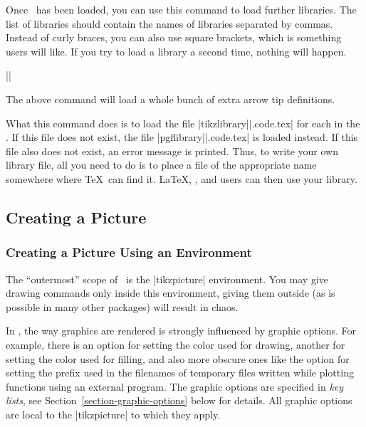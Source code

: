 \begin{command}{\usetikzlibrary{}}
    Once \tikzname\ has been loaded, you can use this command to load further
    libraries. The list of libraries should contain the names of libraries
    separated by commas. Instead of curly braces, you can also use square
    brackets, which is something  users will like. If you try to load
    a library a second time, nothing will happen.

    \example |\usetikzlibrary{arrows.meta}|

    The above command will load a whole bunch of extra arrow tip definitions.

    What this command does is to load the file
    |tikzlibrary||.code.tex| for each  in the
    . If this file does not exist, the file
    |pgflibrary||.code.tex| is loaded instead. If this file also
    does not exist, an error message is printed. Thus, to write your own
    library file, all you need to do is to place a file of the appropriate name
    somewhere where \TeX\ can find it. \LaTeX, , and  users
    can then use your library.
\end{command}


\subsection{Creating a Picture}

\subsubsection{Creating a Picture Using an Environment}

The ``outermost'' scope of \tikzname\ is the |{tikzpicture}| environment. You
may give drawing commands only inside this environment, giving them outside (as
is possible in many other packages) will result in chaos.

In \tikzname, the way graphics are rendered is strongly influenced by graphic
options. For example, there is an option for setting the color used for
drawing, another for setting the color used for filling, and also more obscure
ones like the option  for setting the prefix used in the filenames of temporary
files written while plotting functions using an external program. The graphic
options are specified in \emph{key lists}, see
Section~\ref{section-graphic-options} below for details. All graphic options
are local to the |{tikzpicture}| to which they apply.


